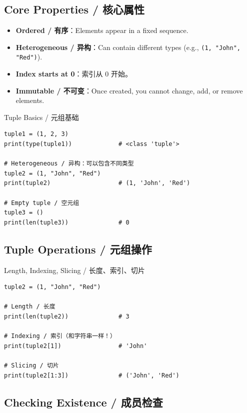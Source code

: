 \documentclass[11pt,a4paper]{report}
\let\oldtexttt\texttt
\renewcommand{\texttt}[1]{\textcolor{mainblue}{\oldtexttt{#1}}}
\begin{document}
\subsection{Core Properties / 核心属性}

\begin{itemize}[itemsep=0.5em]
    \item \textbf{Ordered / 有序}：Elements appear in a fixed sequence.
    \item \textbf{Heterogeneous / 异构}：Can contain different types (e.g., \texttt{(1, "John", "Red")}).
    \item \textbf{Index starts at 0}：索引从 0 开始。
    \item \textbf{Immutable / 不可变}：Once created, you cannot change, add, or remove elements.
\end{itemize}

\begin{examplebox}{Tuple Basics / 元组基础}
\begin{lstlisting}
tuple1 = (1, 2, 3)
print(type(tuple1))             # <class 'tuple'>

# Heterogeneous / 异构：可以包含不同类型
tuple2 = (1, "John", "Red")
print(tuple2)                   # (1, 'John', 'Red')

# Empty tuple / 空元组
tuple3 = ()
print(len(tuple3))              # 0
\end{lstlisting}
\end{examplebox}

\subsection{Tuple Operations / 元组操作}

\begin{examplebox}{Length, Indexing, Slicing / 长度、索引、切片}
\begin{lstlisting}
tuple2 = (1, "John", "Red")

# Length / 长度
print(len(tuple2))              # 3

# Indexing / 索引（和字符串一样！）
print(tuple2[1])                # 'John'

# Slicing / 切片
print(tuple2[1:3])              # ('John', 'Red')
\end{lstlisting}
\end{examplebox}

\subsection{Checking Existence / 成员检查}
\end{document}
